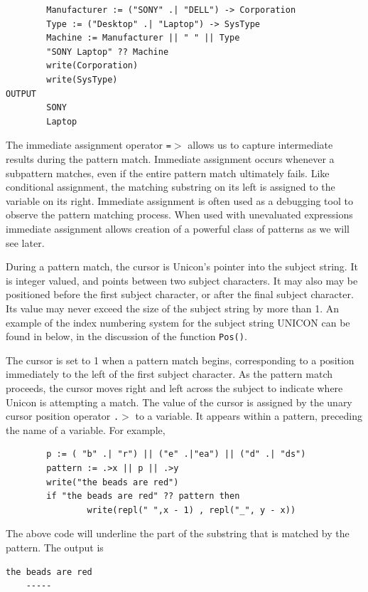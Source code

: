 \documentclass[letterpaper,12pt]{article}
\begin{document}
\begin{verbatim}
        Manufacturer := ("SONY" .| "DELL") -> Corporation
        Type := ("Desktop" .| "Laptop") -> SysType
        Machine := Manufacturer || " " || Type
        "SONY Laptop" ?? Machine
        write(Corporation)
        write(SysType)
OUTPUT
        SONY
        Laptop
\end{verbatim}

The immediate assignment operator \texttt{=$>$} allows us to capture
intermediate results during the pattern match. Immediate assignment
occurs whenever a subpattern matches, even if the entire pattern match
ultimately fails. Like conditional assignment, the matching substring
on its left is assigned to the variable on its right. Immediate
assignment is often used as a debugging tool to observe the pattern
matching process. When used with unevaluated expressions immediate
assignment allows creation of a powerful class of patterns as we will
see later.

During a pattern match, the cursor is Unicon's pointer into the
subject string. It is integer valued, and points between two subject
characters. It may also may be positioned before the first subject
character, or after the final subject character. Its value may never
exceed the size of the subject string by more than 1.  An example of
the index numbering system for the subject string UNICON can be found
in below, in the discussion of the function \texttt{Pos()}.

The cursor is set to 1 when a pattern match begins, corresponding to a
position immediately to the left of the first subject character. As
the pattern match proceeds, the cursor moves right and left across the
subject to indicate where Unicon is attempting a match. The value of
the cursor is assigned by the unary cursor position operator
\texttt{.$>$} to a variable. It appears within a pattern, preceding the
name of a variable. For example,

\begin{verbatim}
        p := ( "b" .| "r") || ("e" .|"ea") || ("d" .| "ds")
        pattern := .>x || p || .>y
        write("the beads are red")
        if "the beads are red" ?? pattern then 
                write(repl(" ",x - 1) , repl("_", y - x))
\end{verbatim}

The above code will underline the part of the substring that is
matched by the pattern. The output is

\begin{verbatim}
the beads are red
    -----
\end{verbatim}
\end{document}
